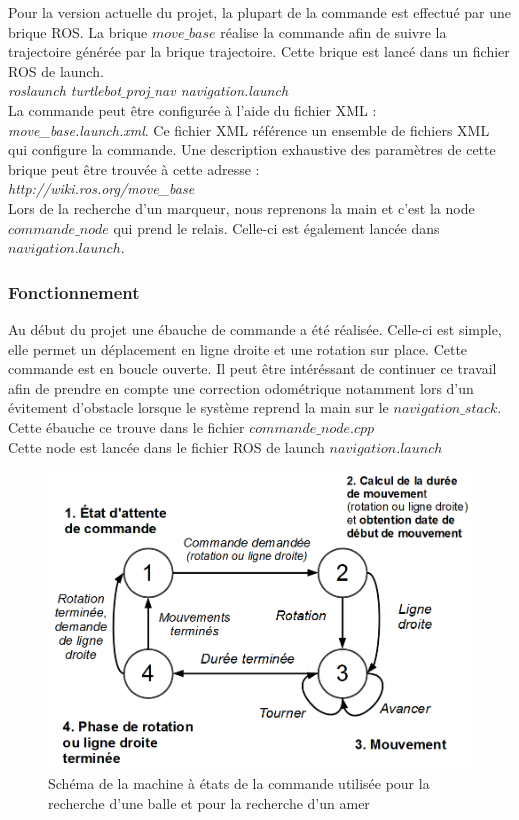 \documentclass[10pt,a4paper]{article}
\begin{document}
Pour la version actuelle du projet, la plupart de la commande est effectué par une brique ROS. La brique $move\_base$ réalise la commande afin de suivre la trajectoire générée par la brique trajectoire. Cette brique est lancé dans un fichier ROS de launch.\\
\textit{roslaunch turtlebot$\_$proj$\_$nav navigation.launch}\\
La commande peut être configurée à l'aide du fichier XML : \textit{move\_base.launch.xml}. Ce fichier XML référence un ensemble de fichiers XML qui configure la commande. Une description exhaustive des paramètres de cette brique peut être trouvée à cette adresse :\\
\textit{http://wiki.ros.org/move\_base}\\
Lors de la recherche d'un marqueur, nous reprenons la main et c'est la node $commande\_node$ qui prend le relais. Celle-ci est également lancée dans $navigation.launch$.

\subsubsection*{Fonctionnement}

Au début du projet une ébauche de commande a été réalisée. Celle-ci est simple, elle permet un déplacement en ligne droite et une rotation sur place. Cette commande est en boucle ouverte. Il peut \^etre intéréssant de continuer ce travail afin de prendre en compte une correction odométrique notamment lors d'un évitement d'obstacle lorsque le système reprend la main sur le $navigation\_stack$.\\
Cette ébauche ce trouve dans le fichier $commande\_node.cpp$ \\
Cette node est lancée dans le fichier ROS de launch $navigation.launch$


\begin{figure}[!h]
\centering\includegraphics[scale=0.4]{figures/commande_MEF.png}
\caption{Schéma de la machine à états de la commande utilisée pour la recherche d'une balle et pour la recherche d'un amer}
\label{commande_MEF}
\end{figure}
\end{document}
